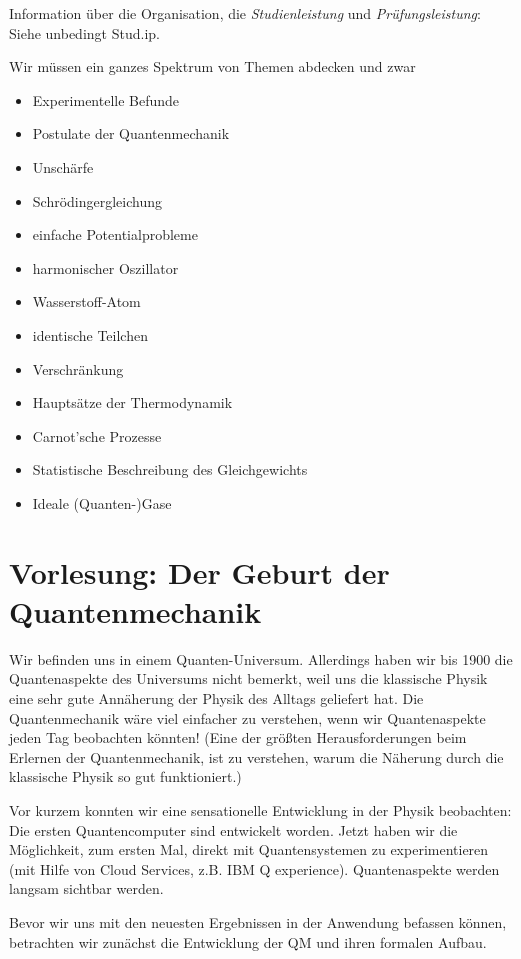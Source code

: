 

Information über die Organisation, die \emph{Studienleistung} und \emph{Prüfungsleistung}: Siehe unbedingt Stud.ip.

Wir müssen ein ganzes Spektrum von Themen abdecken und zwar
\begin{itemize}
\item Experimentelle Befunde
\item Postulate der Quantenmechanik
\item Unschärfe
\item Schrödingergleichung
\item einfache Potentialprobleme
\item harmonischer Oszillator
\item Wasserstoff-Atom
\item identische Teilchen
\item Verschränkung
\item Hauptsätze der Thermodynamik
\item Carnot'sche Prozesse
\item Statistische Beschreibung des Gleichgewichts
\item Ideale (Quanten-)Gase
\end{itemize}

\section{Vorlesung: Der Geburt der Quantenmechanik}
Wir befinden uns in einem Quanten-Universum. Allerdings haben wir bis 1900 die Quantenaspekte des Universums nicht bemerkt, weil uns die klassische Physik eine sehr gute Annäherung der Physik des Alltags geliefert hat. Die Quantenmechanik wäre viel einfacher zu verstehen, wenn wir Quantenaspekte jeden Tag beobachten könnten! (Eine der größten Herausforderungen beim Erlernen der Quantenmechanik, ist zu verstehen, warum die Näherung durch die klassische Physik so gut funktioniert.)

Vor kurzem konnten wir eine sensationelle Entwicklung in der Physik beobachten: Die ersten Quantencomputer sind entwickelt worden. Jetzt haben wir die Möglichkeit, zum ersten Mal, direkt mit Quantensystemen zu experimentieren (mit Hilfe von Cloud Services, z.B. IBM Q experience). Quantenaspekte werden langsam sichtbar werden. 

Bevor wir uns mit den neuesten Ergebnissen in der Anwendung befassen können, betrachten wir zunächst die Entwicklung der QM und ihren formalen Aufbau. 

